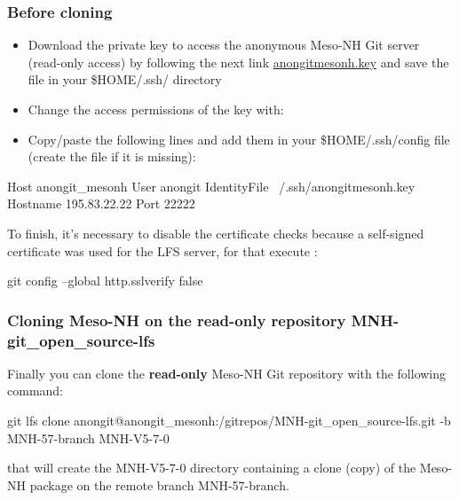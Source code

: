 \subsubsection{Before cloning}

\begin{itemize}
\item Download the private key to access the anonymous Meso-NH Git server (read-only access) by following the next link \href{http://mesonh.aero.obs-mip.fr/mesonh57/GitSources?action=AttachFile&do=get&target=anongitmesonh.key}{anongitmesonh.key} and save the file in your \$HOME/.ssh/ directory
\item Change the access permissions of the key with:
\end{itemize}
\begin{itemize}
\item Copy/paste the following lines and add them in your \$HOME/.ssh/config file (create the file if it is missing):
\end{itemize}
\begin{bashcode}
Host anongit_mesonh
  User anongit
  IdentityFile ~/.ssh/anongitmesonh.key
  Hostname 195.83.22.22
  Port 22222
\end{bashcode}

To finish, it's necessary to disable the certificate checks because a self-signed certificate was used for the LFS server, for that execute :
\begin{bashcode}
git config --global http.sslverify false
\end{bashcode}

\subsubsection{Cloning Meso-NH on the read-only repository MNH-git\_open\_source-lfs}

Finally you can clone the \textbf{read-only} Meso-NH Git repository with the following command:
\begin{bashcode}
git lfs clone anongit@anongit_mesonh:/gitrepos/MNH-git_open_source-lfs.git -b MNH-57-branch MNH-V5-7-0
\end{bashcode}

that will create the MNH-V5-7-0 directory containing a clone (copy) of the Meso-NH package on the remote branch MNH-57-branch.

